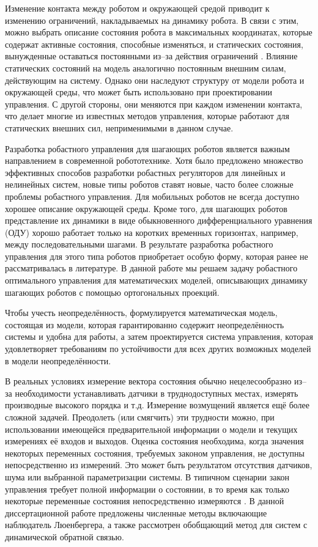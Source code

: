 Изменение контакта между роботом и окружающей средой приводит к изменению ограничений, накладываемых на динамику робота. В связи с этим, можно выбрать описание состояния робота в максимальных координатах, которые содержат активные состояния, способные изменяться, и статических состояния, вынужденные оставаться постоянными из--за действия ограничений \cite{SAVIN2021}. Влияние статических состояний на модель аналогично постоянным внешним силам, действующим на систему. Однако они наследуют структуру от модели робота и окружающей среды, что может быть использовано при проектировании управления. С другой стороны, они меняются при каждом изменении контакта, что делает многие из известных методов управления, которые работают для статических внешних сил, неприменимыми в данном случае.

Разработка робастного управления для шагающих роботов является важным направлением в современной робототехнике. Хотя было предложено множество эффективных способов разработки робастных регуляторов для линейных \cite{POLYAK2021, Nicolett2018} и нелинейных \cite{HAUSWIRTH2024, Celentano2018} систем, новые типы роботов ставят новые, часто более сложные проблемы робастного управления. Для мобильных роботов не всегда доступно хорошее описание окружающей среды. Кроме того, для шагающих роботов представление их динамики в виде обыкновенного дифференциального уравнения (ОДУ) хорошо работает только на коротких временных горизонтах, например, между последовательными шагами. В результате разработка робастного управления для этого типа роботов приобретает особую форму, которая ранее не рассматривалась в литературе. В данной работе мы решаем задачу робастного оптимального управления для математических моделей, описывающих динамику шагающих роботов с помощью ортогональных проекций.

Чтобы учесть неопределённость, формулируется математическая модель, состоящая из модели, которая гарантированно содержит неопределённость системы и удобна для работы, а затем проектируется система управления, которая удовлетворяет требованиям по устойчивости для всех других возможных моделей в модели неопределённости.

В реальных условиях измерение вектора состояния обычно нецелесообразно из--за необходимости устанавливать датчики в труднодоступных местах, измерять производные высокого порядка и т.д. Измерение возмущений является ещё более сложной задачей. Преодолеть (или смягчить) эти трудности можно, при использовании имеющейся предварительной информации о модели и текущих измерениях её входов и выходов. Оценка состояния необходима, когда значения некоторых переменных состояния, требуемых законом управления, не доступны непосредственно из измерений. Это может быть результатом отсутствия датчиков, шума или выбранной параметризации системы. В типичном сценарии закон управления требует полной информации о состоянии, в то время как только некоторые переменные состояния непосредственно измеряются \cite{Ackermann2001}. В данной диссертационной работе предложены численные методы включающие наблюдатель Люенбергера, а также рассмотрен обобщающий метод для систем с динамической обратной связью.

